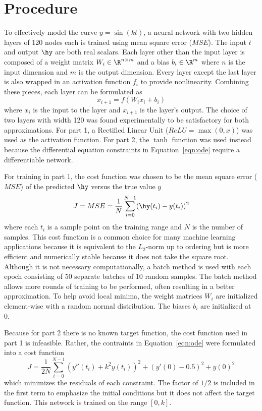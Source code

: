 \documentclass{article}
\begin{document}
    \section{Procedure}
        To effectively model the curve $y = \sin(kt)$, a neural network with two hidden layers of 120 nodes each is trained using mean square error ($MSE$). The input $t$ and output $\hy$ are both real scalars. Each layer other than the input layer is composed of a weight matrix $W_i \in \R^{n \times m}$ and a bias $b_i \in \R^m$ where $n$ is the input dimension and $m$ is the output dimension. Every layer except the last layer is also wrapped in an activation function $f_i$ to provide nonlinearity. Combining these pieces, each layer can be formulated as
        \begin{equation}
            x_{i+1} = f(W_i x_i + b_i)
        \end{equation}
        where $x_i$ is the input to the layer and $x_{i+1}$ is the layer's output. The choice of two layers with width 120 was found experimentally to be satisfactory for both approximations. For part 1, a Rectified Linear Unit ($ReLU = \max(0, x)$) was used as the activation function. For part 2, the $\tanh$ function was used instead because the differential equation constraints in Equation~\ref{eqn:ode} require a differentiable network.

        For training in part 1, the cost function was chosen to be the mean square error ($MSE$) of the predicted $\hy$ versus the true value $y$
        \begin{equation}
            J = MSE = \frac{1}{N} \sum_{i=0}^{N-1} (\hy(t_i) - y(t_i))^2
        \end{equation}
        where each $t_i$ is a sample point on the training range and $N$ is the number of samples. This cost function is a common choice for many machine learning applications because it is equivalent to the $L_2$-norm up to ordering but is more efficient and numerically stable because it does not take the square root. Although it is not necessary computationally, a batch method is used with each epoch consisting of 50 separate batches of 10 random samples. The batch method allows more rounds of training to be performed, often resulting in a better approximation. To help avoid local minima, the weight matrices $W_i$ are initialized element-wise with a random normal distribution. The biases $b_i$ are initialized at 0.

        Because for part 2 there is no known target function, the cost function used in part 1 is infeasible. Rather, the contraints in Equation~\ref{eqn:ode} were formulated into a cost function
        \begin{equation}
            J = \frac{1}{2N} \sum_{i=0}^{N-1} (y''(t_i) + k^2 y(t_i))^2 + (y'(0) - 0.5)^2 + y(0)^2
        \end{equation}
        which minimizes the residuals of each constraint. The factor of $1/2$ is included in the first term to emphasize the initial conditions but it does not affect the target function. This network is trained on the range $[0,k]$.
\end{document}
